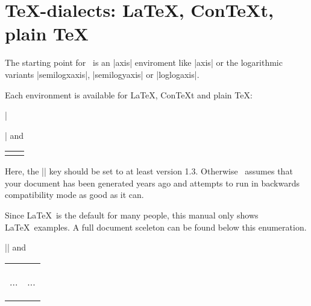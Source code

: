 
\section{\TeX-dialects: \LaTeX, Con{\TeX}t, plain \TeX }
\label{sec:tex:dialects}%
The starting point for \PGFPlots\ is an |axis| enviroment like |axis| or the logarithmic variants |semilogxaxis|, |semilogyaxis| or |loglogaxis|.

Each environment is available for \LaTeX, Con{\TeX}t and plain \TeX:
\begin{description}
\def\HEAD{%
	\small
	\begin{tabular}{*{2}{p{4cm}}}%
}%
\item[\LaTeX:] |\usepackage{pgfplots} | and

{\HEAD
\begin{codeexample}
\begin{tikzpicture}
\begin{axis}
...
\end{axis}
\end{tikzpicture}
\end{codeexample}
&
\begin{codeexample}
\begin{tikzpicture}
\begin{semilogxaxis}
...
\end{semilogxaxis}
\end{tikzpicture}
\end{codeexample}
\\
\end{tabular}%
}

Here, the || key should be set to at least version 1.3. Otherwise \PGFPlots\ assumes that your document has been generated years ago and attempts to run in backwards compatibility mode as good as it can.

Since \LaTeX\ is the default for many people, this manual only shows \LaTeX\ examples. A full document sceleton can be found below this enumeration.


\item[Con{\TeX}t:] |\usemodule[pgfplots] \pgfplotsset[compat=|\pgfkeysvalueof{/pgfplots/compat/mostrecent}|]| and

{\HEAD
\begin{codeexample}
\starttikzpicture
\startaxis
...
\stopaxis
\stoptikzpicture
\end{codeexample}
&
\begin{codeexample}
\starttikzpicture
\startsemilogxaxis
...
\stopsemilogxaxis
\stoptikzpicture
\end{codeexample}
\\
\end{tabular}%
}


\end{description}
